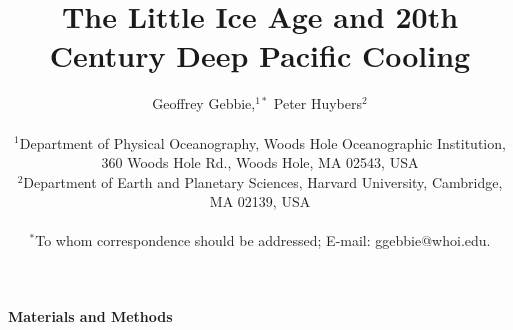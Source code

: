 \documentclass[12pt]{article}
\title{The Little Ice Age and 20th Century Deep Pacific Cooling}
\author
{Geoffrey Gebbie,$^{1\ast}$ Peter Huybers$^{2}$ \\
\\
\normalsize{$^{1}$Department of Physical Oceanography, Woods Hole Oceanographic Institution,}\\
\normalsize{360 Woods Hole Rd., Woods Hole, MA 02543, USA}\\
\normalsize{$^{2}$Department of Earth and Planetary Sciences, Harvard University, Cambridge, MA 02139, USA}\\
\\
\normalsize{$^\ast$To whom correspondence should be addressed; E-mail:  ggebbie@whoi.edu.}
}
\date{}
\newenvironment{sciabstract}{%
\begin{quote} \bf}
{\end{quote}}
\begin{document}
 


\baselineskip24pt


\maketitle 


\begin{sciabstract}
\end{sciabstract}


{\bf {\Large Materials and Methods}}
\end{document}
